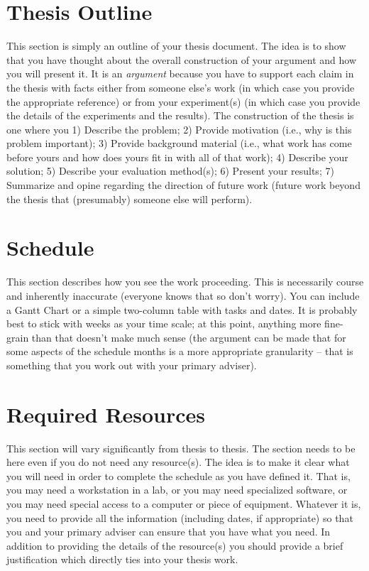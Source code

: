\documentclass[12pt,american]{report}
\begin{document}
\chapter{Thesis Outline}
This section is simply an outline of your thesis document.  The idea is to 
show that you have thought about the overall construction of your argument 
and how you will present it.  It is an \emph{argument} because you have to 
support each claim in the thesis with facts either from someone else's 
work (in which case you provide the appropriate reference) or from your 
experiment(s) (in which case you provide the details of the experiments 
and the results).  The construction of the thesis is one where you 
1) Describe the problem; 2) Provide motivation (i.e., why is this problem 
important); 3) Provide background material (i.e., what work has come 
before yours and how does yours fit in with all of that work); 4) Describe 
your solution; 5) Describe your evaluation method(s); 6) Present your 
results; 7) Summarize and opine regarding the direction of future work 
(future work beyond the thesis that (presumably) someone else will perform).

\chapter{Schedule}
This section describes how you see the work proceeding.  This is necessarily 
course and inherently inaccurate (everyone knows that so don't worry).  
You can include a Gantt Chart or a simple two-column table with tasks and 
dates.  It is probably best to stick with weeks as your time scale; at this 
point, anything more fine-grain than that doesn't make much sense (the 
argument can be made that for some aspects of the schedule months is a 
more appropriate granularity -- that is something that you work out with 
your primary adviser).

\chapter{Required Resources}
This section will vary significantly from thesis to thesis.  The section needs 
to be here even if you do not need any resource(s).  The idea is to make it 
clear what you will need in order to complete the schedule as you have defined 
it.  That is, you may need a workstation in a lab, or you may need specialized 
software, or you may need special access to a computer or piece of equipment.  
Whatever it is, you need to provide all the information (including dates, if 
appropriate) so that you and your primary adviser can ensure that you have 
what you need.  In addition to providing the details of the resource(s) you 
should provide a brief justification which directly ties into your thesis work.
\end{document}
